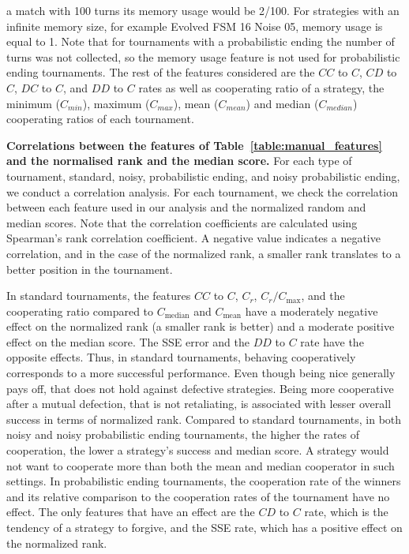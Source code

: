 \documentclass{article}
\begin{document}
\begin{table}[!htbp]
{    a match with 100 turns its memory usage would be 2/100. For strategies with an
    infinite memory size, for example Evolved FSM 16 Noise 05, memory usage is equal
    to 1. Note that for tournaments with a probabilistic ending the number of turns
    was not collected, so the memory usage feature is not used for probabilistic
    ending tournaments. The rest of the features considered are the $CC$
    to $C$, $CD$ to $C$, $DC$ to $C$, and $DD$ to $C$ rates as well as
    cooperating ratio of a strategy, the minimum (\(C_{min}\)), maximum
    (\(C_{max}\)), mean (\(C_{mean}\)) and median (\(C_{median}\)) cooperating
    ratios of each tournament.}
    \label{table:manual_features}
\end{table}

\begin{table}[!htbp]
    \begin{center}
    \resizebox{.8\textwidth}{!}{
        
    }
\end{center}
\caption{\textbf{Correlations between the features of Table~\ref{table:manual_features}
and the normalised rank and the median score.} For each type of
tournament, standard, noisy, probabilistic ending, and noisy probabilistic
ending, we conduct a correlation analysis. For each tournament, we check the
correlation between each feature used in our analysis and the normalized random
and median scores. Note that the correlation coefficients are calculated using
Spearman's rank correlation coefficient. A negative value indicates a negative
correlation, and in the case of the normalized rank, a smaller rank translates
to a better position in the tournament.}\label{table:correlations}
\end{table}

In standard tournaments, the features \(CC\) to \(C\), \(C_r\), \(C_r /
C_{\text{max}}\), and the cooperating ratio compared to \(C_{\text{median}}\)
and \(C_{\text{mean}}\) have a moderately negative effect on the normalized rank
(a smaller rank is better) and a moderate positive effect on the median score.
The SSE error and the \(DD\) to \(C\) rate have the opposite effects. Thus, in
standard tournaments, behaving cooperatively corresponds to a more successful
performance. Even though being nice generally pays off, that does not hold
against defective strategies. Being more cooperative after a mutual defection,
that is not retaliating, is associated with lesser overall success in terms of
normalized rank.
Compared to standard tournaments, in both noisy and noisy probabilistic ending
tournaments, the higher the rates of cooperation, the lower a strategy's success
and median score. A strategy would not want to cooperate more than both the mean
and median cooperator in such settings. In probabilistic ending tournaments, the
cooperation rate of the winners and its relative comparison to the cooperation
rates of the tournament have no effect. The only features that have an effect
are the \(CD\) to \(C\) rate, which is the tendency of a strategy to forgive,
and the SSE rate, which has a positive effect on the normalized rank.
\end{document}
